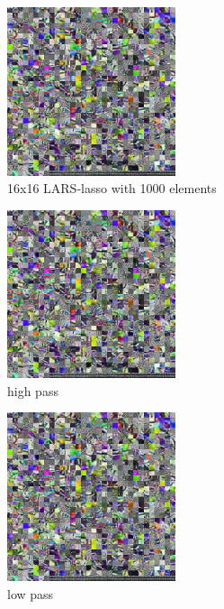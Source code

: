 \begin{figure}
\centering
\includegraphics[width = 0.44\textwidth]{images/16_1000_1000_10_lasso.png}
\caption{16x16 LARS-lasso with 1000 elements}
\label{fig:16_1000_lasso}
\end{figure}


\begin{figure}
\centering
\includegraphics[width = 0.44\textwidth]{images/16_1000_1000_10_lasso.png}
\caption{high pass}
\label{fig:16_1000_lasso}
\end{figure}

\begin{figure}
\centering
\includegraphics[width = 0.44\textwidth]{images/16_1000_1000_10_lasso.png}
\caption{low pass}
\label{fig:16_1000_lasso}
\end{figure}


